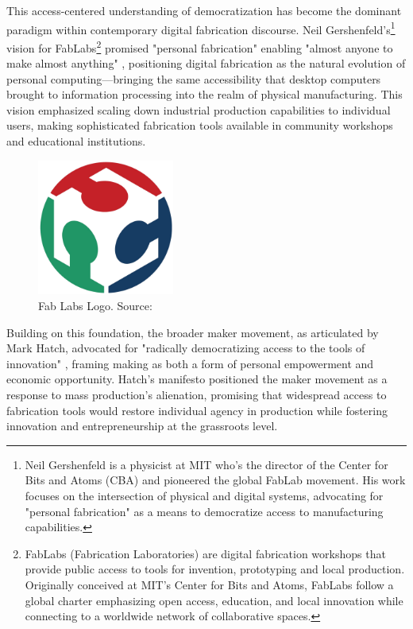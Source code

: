 This access-centered understanding of democratization has become the dominant paradigm within contemporary digital fabrication discourse. Neil Gershenfeld's\footnote{Neil Gershenfeld is a physicist at MIT who's the director of the Center for Bits and Atoms (CBA) and pioneered the global FabLab movement. His work focuses on the intersection of physical and digital systems, advocating for "personal fabrication" as a means to democratize access to manufacturing capabilities.} vision for FabLabs\footnote{FabLabs (Fabrication Laboratories) are digital fabrication workshops that provide public access to tools for invention, prototyping and local production. Originally conceived at MIT's Center for Bits and Atoms, FabLabs follow a global charter emphasizing open access, education, and local innovation while connecting to a worldwide network of collaborative spaces.} promised "personal fabrication" enabling "almost anyone to make almost anything" \citep{gershenfeld2007}, positioning digital fabrication as the natural evolution of personal computing—bringing the same accessibility that desktop computers brought to information processing into the realm of physical manufacturing. This vision emphasized scaling down industrial production capabilities to individual users, making sophisticated fabrication tools available in community workshops and educational institutions.

\begin{figure}[H]
\centering
\includegraphics[width=0.4\textwidth]{figures/chapter2/fablab.png}
\caption{Fab Labs Logo. Source: \cite{fabfoundation2024}}
\label{fig:fablab_logo}
\end{figure}

Building on this foundation, the broader maker movement, as articulated by Mark Hatch, advocated for "radically democratizing access to the tools of innovation" \citep{hatch2013}, framing making as both a form of personal empowerment and economic opportunity. Hatch's manifesto positioned the maker movement as a response to mass production's alienation, promising that widespread access to fabrication tools would restore individual agency in production while fostering innovation and entrepreneurship at the grassroots level.

